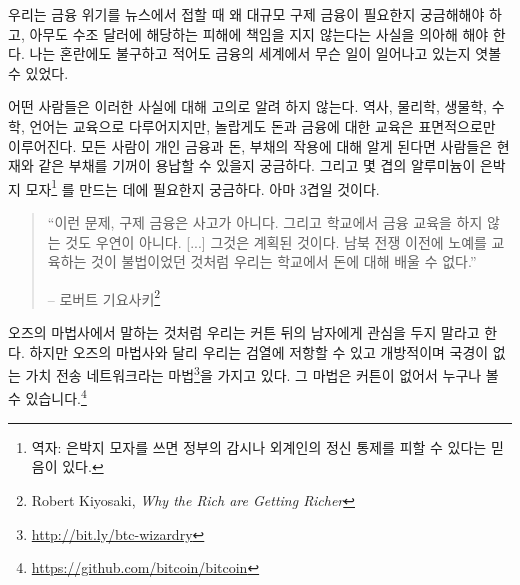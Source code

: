 \newpage

우리는 금융 위기를 뉴스에서 접할 때 왜 대규모 구제 금융이 필요한지 궁금해해야 하고, 아무도 수조 달러에 해당하는
피해에 책임을 지지 않는다는 사실을 의아해 해야 한다. 
나는 혼란에도 불구하고 적어도 금융의 세계에서 무슨 일이 일어나고 있는지 엿볼 수 있었다.

어떤 사람들은 이러한 사실에 대해 고의로 알려 하지 않는다. 
역사, 물리학, 생물학, 수학, 언어는 교육으로 다루어지지만, 
놀랍게도 돈과 금융에 대한 교육은 표면적으로만 이루어진다. 
모든 사람이 개인 금융과 돈, 부채의 작용에 대해 알게 된다면 사람들은 현재와 같은 부채를 기꺼이 용납할 수 있을지 궁금하다. 
그리고 몇 겹의 알루미늄이 은박지 모자\footnote{역자: 은박지 모자를 쓰면 정부의 감시나 외계인의 정신 통제를 피할 수 있다는 믿음이 있다.}
를 만드는 데에 필요한지 궁금하다.
아마 3겹일 것이다.

\begin{quotation}\begin{samepage}
\enquote{이런 문제, 구제 금융은 사고가 아니다. 그리고 학교에서 금융 교육을 하지 않는 것도 우연이 아니다. [...] 그것은 계획된 것이다.
남북 전쟁 이전에 노예를 교육하는 것이 불법이었던 것처럼 우리는 학교에서 돈에 대해 배울 수 없다.}
\begin{flushright} -- 로버트 기요사키\footnote{Robert Kiyosaki, \textit{Why the Rich
are Getting Richer}\cite{robert-kiyosaki}}
\end{flushright}\end{samepage}\end{quotation}


오즈의 마법사에서 말하는 것처럼 우리는 커튼 뒤의 남자에게 관심을 두지 말라고 한다. 
하지만 오즈의 마법사와 달리
우리는 검열에 저항할 수 있고 개방적이며 국경이 없는 가치 전송 네트워크라는 마법\footnote{\url{http://bit.ly/btc-wizardry}}을 가지고 있다.
그 마법은 커튼이 없어서 누구나 볼 수 있습니다.\footnote{\url{https://github.com/bitcoin/bitcoin}}

